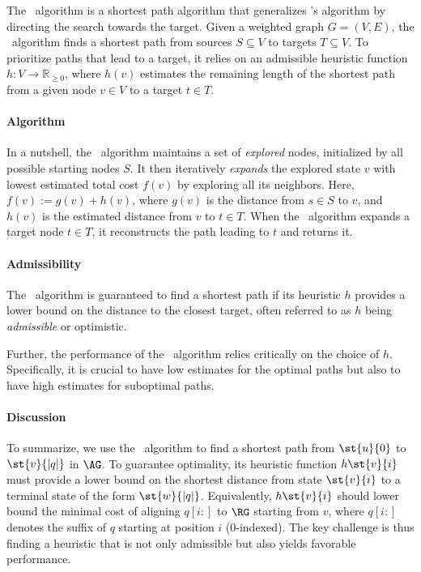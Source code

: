 
%
The \A~algorithm is a shortest path algorithm that generalizes \dijkstra's
algorithm by directing the search towards the target.
Given a weighted graph $G=(V,E)$, the \A~algorithm finds a shortest path from
sources $S \subseteq V$ to targets $T \subseteq V$.
%
To prioritize paths that lead to a target, it relies on an admissible heuristic
function $h \colon V \to \mathbb{R}_{\geq 0}$, where $h(v)$ estimates the
remaining length of the shortest path from a given node $v \in V$ to a target
$t \in T$.

\paragraph{Algorithm}
% 
In a nutshell, the \A~algorithm maintains a set of \emph{explored} nodes,
initialized by all possible starting nodes $S$. It then iteratively
\emph{expands} the explored state $v$ with lowest estimated total cost $f(v)$ by
exploring all its neighbors. Here, $f(v) := g(v) + h(v)$, where $g(v)$ is the
distance from $s \in S$ to $v$, and $h(v)$ is the estimated distance from $v$ to
$t \in T$.
%
When the \A~algorithm expands a target node $t \in T$, it reconstructs the path
leading to $t$ and returns it.
%
\paragraph{Admissibility}
%
The \A~algorithm is guaranteed to find a shortest path if its heuristic $h$
provides a lower bound on the distance to the closest target, often referred to
as $h$ being \emph{admissible} or optimistic.

Further, the performance of the \A~algorithm relies critically on the choice of
$h$. Specifically, it is crucial to have low estimates for the optimal paths but
also to have high estimates for suboptimal paths.

\paragraph{Discussion}
%
To summarize, we use the \A~algorithm to find a shortest path from $\st{u}{0}$
to $\st{v}{|q|}$ in $\AG$. To guarantee optimality, its heuristic function
$h\st{v}{i}$ must provide a lower bound on the shortest distance from state
$\st{v}{i}$ to a terminal state of the form $\st{w}{\lvert q \rvert}$.
%
Equivalently, $h\st{v}{i}$ should lower bound the minimal cost of aligning
$q[i{:}]$ to $\RG$ starting from $v$, where $q[i{:}]$ denotes the suffix of $q$
starting at position $i$ ($0$-indexed).
%
The key challenge is thus finding a heuristic that is not only admissible but
also yields favorable performance.

